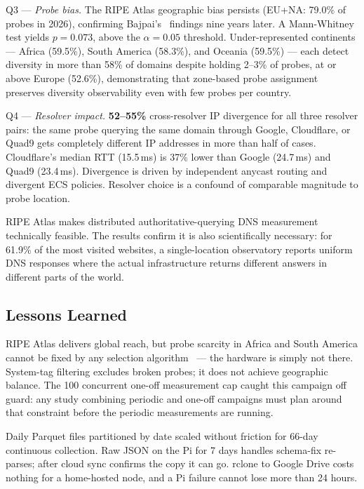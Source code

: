 Q3 --- \textit{Probe bias.} The RIPE Atlas geographic bias persists (EU+NA: 79.0\% of probes in 2026), confirming Bajpai's~\cite{Bajpai2017} findings nine years later. A Mann-Whitney test yields $p = 0.073$, above the $\alpha = 0.05$ threshold. Under-represented continents --- Africa (59.5\%), South America (58.3\%), and Oceania (59.5\%) --- each detect diversity in more than 58\% of domains despite holding 2--3\% of probes, at or above Europe (52.6\%), demonstrating that zone-based probe assignment preserves diversity observability even with few probes per country.

Q4 --- \textit{Resolver impact.} \textbf{52--55\%} cross-resolver \ac{IP} divergence for all three resolver pairs: the same probe querying the same domain through Google, Cloudflare, or Quad9 gets completely different \ac{IP} addresses in more than half of cases. Cloudflare's median \ac{RTT} (15.5\,ms) is 37\% lower than Google (24.7\,ms) and Quad9 (23.4\,ms). Divergence is driven by independent anycast routing and divergent \ac{ECS} policies. Resolver choice is a confound of comparable magnitude to probe location.

RIPE Atlas makes distributed authoritative-querying \ac{DNS} measurement technically feasible. The results confirm it is also scientifically necessary: for 61.9\% of the most visited websites, a single-location observatory reports uniform \ac{DNS} responses where the actual infrastructure returns different answers in different parts of the world.

\bigskip
\subsection{Lessons Learned}
\label{subsec:5.5.3}

RIPE Atlas delivers global reach, but probe scarcity in Africa and South America cannot be fixed by any selection algorithm~\cite{Bajpai2017} --- the hardware is simply not there. System-tag filtering excludes broken probes; it does not achieve geographic balance. The 100 concurrent one-off measurement cap caught this campaign off guard: any study combining periodic and one-off campaigns must plan around that constraint before the periodic measurements are running.

Daily Parquet files partitioned by date scaled without friction for 66-day continuous collection. Raw JSON on the Pi for 7 days handles schema-fix re-parses; after cloud sync confirms the copy it can go. rclone to Google Drive costs nothing for a home-hosted node, and a Pi failure cannot lose more than 24 hours.

